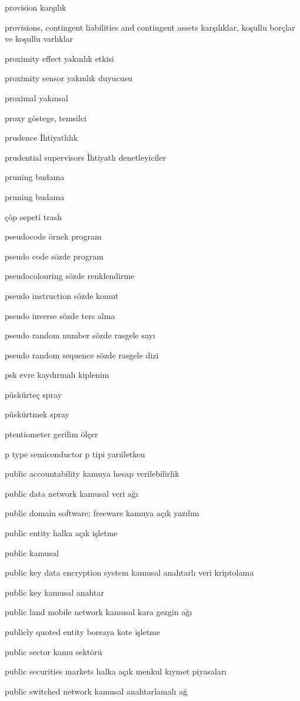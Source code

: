 \documentclass[12pt,fleqn]{article}\usepackage{../../common}
\begin{document}
provision karşılık

provisions, contingent liabilities and contingent assets karşılıklar, koşullu borçlar ve koşullu varlıklar

proximity effect yakınlık etkisi

proximity sensor yakınlık duyucusu

proximal yakınsal

proxy göstege, temsilci

prudence İhtiyatlılık

prudential supervisors İhtiyatlı denetleyiciler

pruning budama

pruning budama

çöp sepeti trash

pseudocode örnek program

pseudo code sözde program

pseudocolouring sözde renklendirme

pseudo instruction sözde komut

pseudo inverse sözde ters alma

pseudo random number sözde rasgele sayı

pseudo random sequence sözde rasgele dizi

psk evre kaydırmalı kiplenim

püskürteç spray

püskürtmek spray

ptentiometer gerilim ölçer

p type semiconductor p tipi yarıiletken

public accountability kamuya hesap verilebilirlik

public data network kamusal veri ağı

public domain software; freeware kamuya açık yazılım

public entity halka açık işletme

public kamusal

public key data encryption system kamusal anahtarlı veri kriptolama

public key kamusal anahtar

public land mobile network kamusal kara gezgin ağı

publicly quoted entity borsaya kote işletme

public sector kamu sektörü

public securities markets halka açık menkul kıymet piyasaları

public switched network kamusal anahtarlamalı ağ
\end{document}
